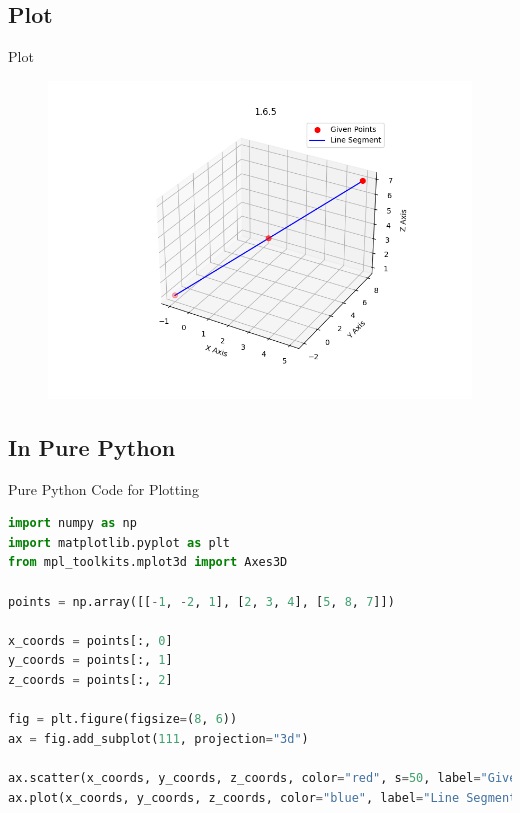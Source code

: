 \documentclass{beamer}
\theoremstyle{remark}
\numberwithin{equation}{section}
\begin{document}
\subsection{Plot}
\begin{frame}{Plot}
 \begin{figure}[H]
    \centering
    \includegraphics[width=\columnwidth]{../figs/plot.png}
    \caption*{}
    \label{fig:plot_c}
\end{figure}
\end{frame}
\subsection{In Pure Python}
\begin{frame}[fragile]{Pure Python Code for Plotting}
\begin{lstlisting}[language=Python]
import numpy as np
import matplotlib.pyplot as plt
from mpl_toolkits.mplot3d import Axes3D

points = np.array([[-1, -2, 1], [2, 3, 4], [5, 8, 7]])

x_coords = points[:, 0]
y_coords = points[:, 1]
z_coords = points[:, 2]

fig = plt.figure(figsize=(8, 6))
ax = fig.add_subplot(111, projection="3d")

ax.scatter(x_coords, y_coords, z_coords, color="red", s=50, label="Given Points")
ax.plot(x_coords, y_coords, z_coords, color="blue", label="Line Segment")

\end{lstlisting}
\end{frame}
\end{document}
